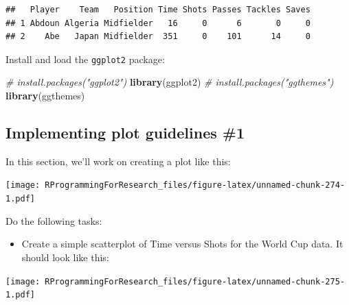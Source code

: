 \documentclass[]{book}
\makeatletter
\newenvironment{Shaded}{\begin{snugshade}}{\end{snugshade}}
\newcommand{\KeywordTok}[1]{\textcolor[rgb]{0.13,0.29,0.53}{\textbf{#1}}}
\newcommand{\DataTypeTok}[1]{\textcolor[rgb]{0.13,0.29,0.53}{#1}}
\newcommand{\DecValTok}[1]{\textcolor[rgb]{0.00,0.00,0.81}{#1}}
\newcommand{\StringTok}[1]{\textcolor[rgb]{0.31,0.60,0.02}{#1}}
\newcommand{\CommentTok}[1]{\textcolor[rgb]{0.56,0.35,0.01}{\textit{#1}}}
\newcommand{\OperatorTok}[1]{\textcolor[rgb]{0.81,0.36,0.00}{\textbf{#1}}}
\newcommand{\NormalTok}[1]{#1}
\providecommand{\tightlist}{%
  \setlength{\itemsep}{0pt}\setlength{\parskip}{0pt}}
\newenvironment{kframe}{%
\medskip{}
\setlength{\fboxsep}{.8em}
 \def\at@end@of@kframe{}%
 \ifinner\ifhmode%
  \def\at@end@of@kframe{\end{minipage}}%
  \begin{minipage}{\columnwidth}%
 \fi\fi%
 \def\FrameCommand##1{\hskip\@totalleftmargin \hskip-\fboxsep
 \colorbox{shadecolor}{##1}\hskip-\fboxsep
     \hskip-\linewidth \hskip-\@totalleftmargin \hskip\columnwidth}%
 \MakeFramed {\advance\hsize-\width
   \@totalleftmargin\z@ \linewidth\hsize
   \@setminipage}}%
 {\par\unskip\endMakeFramed%
 \at@end@of@kframe}
\renewenvironment{Shaded}{\begin{kframe}}{\end{kframe}}
\theoremstyle{definition}
\theoremstyle{definition}
\theoremstyle{definition}
\theoremstyle{remark}
\makeatother
\begin{document}
\begin{Shaded}
\end{Shaded}

\begin{verbatim}
##   Player    Team   Position Time Shots Passes Tackles Saves
## 1 Abdoun Algeria Midfielder   16     0      6       0     0
## 2    Abe   Japan Midfielder  351     0    101      14     0
\end{verbatim}

Install and load the \texttt{ggplot2} package:

\begin{Shaded}
\begin{Highlighting}[]
\CommentTok{# install.packages("ggplot2")}
\KeywordTok{library}\NormalTok{(ggplot2)}
\CommentTok{# install.packages("ggthemes")}
\KeywordTok{library}\NormalTok{(ggthemes)}
\end{Highlighting}
\end{Shaded}

\subsection{Implementing plot guidelines
\#1}\label{implementing-plot-guidelines-1}

In this section, we'll work on creating a plot like this:

\texttt{[image: RProgrammingForResearch\_files/figure-latex/unnamed-chunk-274-1.pdf]}

Do the following tasks:

\begin{itemize}
\tightlist
\item
  Create a simple scatterplot of Time versus Shots for the World Cup
  data. It should look like this:
\end{itemize}

\texttt{[image: RProgrammingForResearch\_files/figure-latex/unnamed-chunk-275-1.pdf]}
\end{document}
